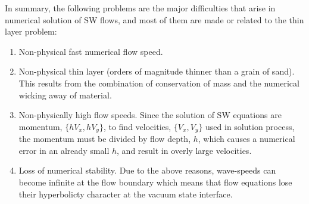 \documentclass[letterpaper,10pt]{article}
\begin{document}
In summary, the following problems are the major difficulties that arise in numerical solution of SW flows, and most of them are made or related to the thin layer problem:

\begin{enumerate}
\item \label{problemwicking}
      Non-physical fast numerical flow speed.      
\item \label{problemtoothin}
      Non-physical thin layer (orders of magnitude thinner than a grain of sand). This results from the combination of conservation of mass and the numerical wicking away of material.
\item \label{problemtoofast}
      Non-physically high flow speeds.  Since the solution of SW equations are momentum, $\{hV_x,hV_y\}$, to find velocities, $\{V_x,V_y\}$ used in solution process, the momentum must be divided by flow depth, $h$, which causes a numerical error in an already small $h$, and result in overly large velocities.
\item \label{problemunstable}
      Loss of numerical stability.  Due to the above reasons, wave-speeds can become infinite at the flow boundary which means that flow equations lose their hyperbolicty character at the vacuum state interface.
\end{enumerate}\label{thinprob}
\end{document}
